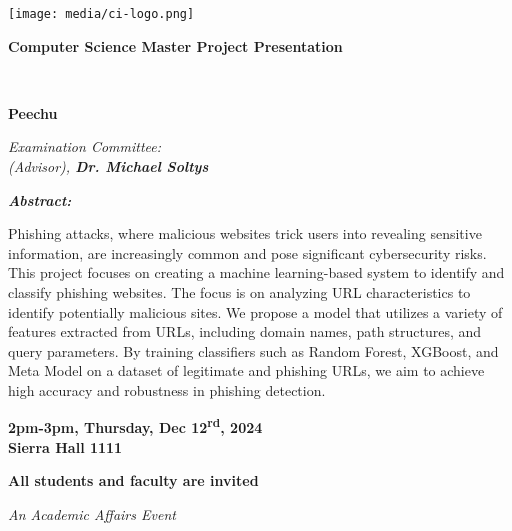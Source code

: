 \documentclass{article}
\begin{document}
\begin{center}

\texttt{[image: media/ci-logo.png]}\\

\hfill\break

\LARGE
\textbf{\color{grey}Computer Science Master Project Presentation}\\

\hfill\break
\hfill\break

\Large
{\bf \thesistitle}\\

\vspace{5mm}

\large
{\bf \Amogh Peechu}\\

\vspace{5mm}

\large
\textit{ Examination Committee:\\
{\bf \advisorname} (Advisor), {\bf Dr. Michael Soltys}}\\

\hfill\break

\end{center}

\begin{adjustwidth}{1in}{1in}
\textit{\bf Abstract:}\\

\vspace{3mm}

\normalsize
\noindent Phishing attacks, where malicious websites trick users into revealing sensitive information, are increasingly common and pose significant cybersecurity risks. This project focuses on creating a machine learning-based system to identify and classify phishing websites. The focus is on analyzing URL characteristics to identify potentially malicious sites. We propose a model that utilizes a variety of features extracted from URLs, including domain names, path structures, and query parameters. By training classifiers such as Random Forest, XGBoost, and Meta Model on a dataset of legitimate and phishing URLs, we aim to achieve high accuracy and robustness in phishing detection.
\end{adjustwidth}

\hfill\break

\begin{center}

\LARGE
{\bf 2pm-3pm, Thursday, Dec 12\textsuperscript{rd}, 2024\\
Sierra Hall 1111}\\

\vspace{15mm}

\large
{\bf All students and faculty are invited}\\

\hfill\break

\small
{\it An Academic Affairs Event}

\end{center}
\end{document}

